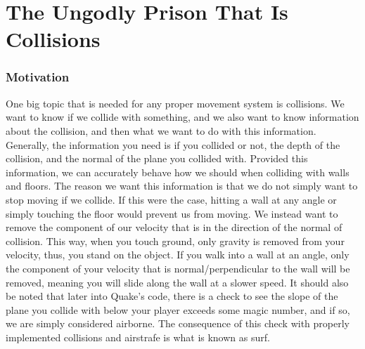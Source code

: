 \documentclass{article}
\begin{document}
\part{The Ungodly Prison That Is Collisions}
\section{Motivation}
One big topic that is needed for any proper movement system is collisions. We want to know if we collide with something, and we also want to know information about the collision, and then what we want to do with this information. Generally, the information you need is if you collided or not, the depth of the collision, and the normal of the plane you collided with. Provided this information, we can accurately behave how we should when colliding with walls and floors. The reason we want this information is that we do not simply want to stop moving if we collide. If this were the case, hitting a wall at any angle or simply touching the floor would prevent us from moving. We instead want to remove the component of our velocity that is in the direction of the normal of collision. This way, when you touch ground, only gravity is removed from your velocity, thus, you stand on the object. If you walk into a wall at an angle, only the component of your velocity that is normal/perpendicular to the wall will be removed, meaning you will slide along the wall at a slower speed. It should also be noted that later into Quake's code, there is a check to see the slope of the plane you collide with below your player exceeds some magic number, and if so, we are simply considered airborne. The consequence of this check with properly implemented collisions and airstrafe is what is known as surf.
\end{document}
